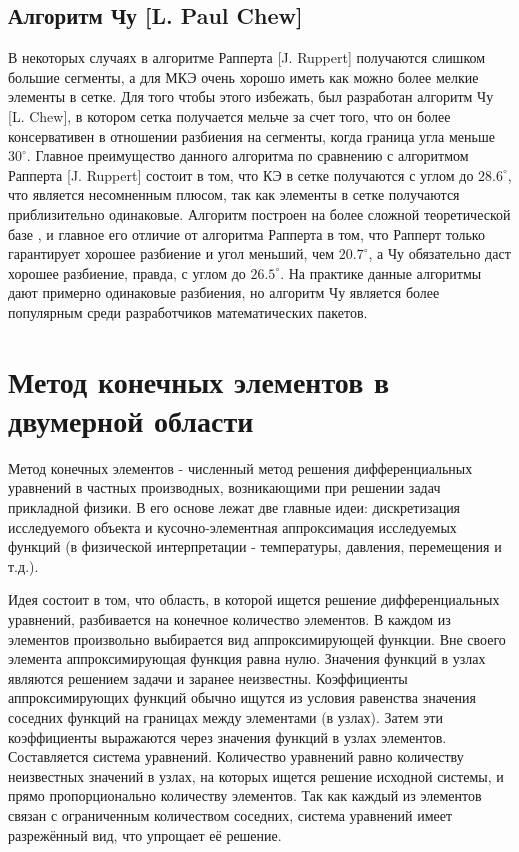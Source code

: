 \documentclass[14pt]{extreport}
\begin{document}
\section{Алгоритм Чу [L. Paul Chew]}

В некоторых случаях в алгоритме Рапперта [J. Ruppert] получаются слишком большие сегменты, а для МКЭ очень хорошо иметь как можно более мелкие элементы в сетке. Для того чтобы этого избежать, был разработан алгоритм Чу [L. Chew], в котором сетка получается мельче за счет того, что он более консервативен в отношении разбиения на сегменты, когда граница угла меньше $30^{\circ}$. Главное преимущество данного алгоритма по сравнению с алгоритмом Рапперта [J. Ruppert] состоит в том, что КЭ в сетке получаются с углом до $28.6^{\circ}$, что является несомненным плюсом, так как элементы в сетке получаются приблизительно одинаковые. Алгоритм построен на более сложной теоретической базе \cite{bib:triangle:chew}, и главное его отличие от алгоритма Рапперта в том, что Рапперт только гарантирует хорошее разбиение и угол меньший, чем $20.7^{\circ}$, а Чу обязательно даст хорошее разбиение, правда, с углом до $26.5^{\circ}$. На практике данные алгоритмы дают примерно одинаковые разбиения, но алгоритм Чу является более популярным среди разработчиков математических пакетов.

\chapter{Метод конечных элементов в двумерной области}

Метод конечных элементов \cite{bib:fem:pankratov, bib:fem:zenkevich} - численный метод решения дифференциальных уравнений в частных производных, возникающими при решении задач прикладной физики.
	В его основе лежат две главные идеи: дискретизация исследуемого объекта и кусочно-элементная аппроксимация исследуемых функций (в физической интерпретации - температуры, давления, перемещения и т.д.).

Идея состоит в том, что область, в которой ищется решение дифференциальных уравнений, разбивается на конечное количество элементов. В каждом из элементов произвольно выбирается вид аппроксимирующей функции. Вне своего элемента аппроксимирующая функция равна нулю. Значения функций в узлах являются решением задачи и заранее неизвестны. Коэффициенты аппроксимирующих функций обычно ищутся из условия равенства значения соседних функций на границах между элементами (в узлах). Затем эти коэффициенты выражаются через значения функций в узлах элементов. Составляется система уравнений. Количество уравнений равно количеству неизвестных значений в узлах, на которых ищется решение исходной системы, и прямо пропорционально количеству элементов. Так как каждый из элементов связан с ограниченным количеством соседних, система уравнений имеет разрежённый вид, что упрощает её решение. 
\end{document}
